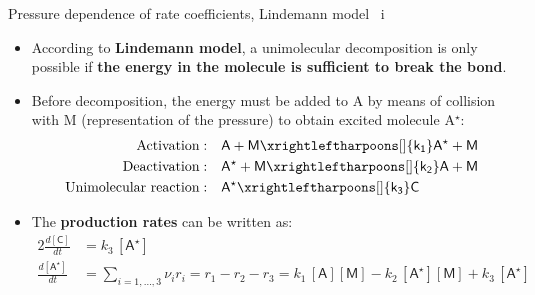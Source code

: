 %
%
\begin{frame}{Pressure dependence of rate coefficients, Lindemann model \, i}
	\begin{itemize}
		\item According to \alert{\bf Lindemann model}, a unimolecular decomposition is only possible if {\bf the energy in the molecule is 
		sufficient to break the bond}.
		\item Before decomposition, the energy must be added to A by means of collision with M (representation of the pressure) to obtain excited molecule A$^\star$:
		 \begin{alignat*}{2}
			\mbox{Activation} : & \quad \mathsf{A + M \xrightleftharpoons[]{k_1} A^\star + M} \\
			\mbox{Deactivation}: & \quad \mathsf{A^\star + M \xrightleftharpoons[]{k_2} A + M} \\
			\mbox{Unimolecular reaction}: & \quad \mathsf{A^\star \xrightleftharpoons[]{k_3} C}
		 \end{alignat*}
		\item The {\bf production rates} can be written as: 
		 \begin{alignat*}{2}
			\tfrac{d\mathsf{[C]}}{dt}          & = k_3 \, \mathsf{[A^\star]} \\
			\tfrac{d\mathsf{[A^\star]}}{dt} & 
			= \sum_{i = 1, \ldots, 3} \nu_i r_i 
			=  r_1 - r_2 - r_3 
			= k_1 \, \mathsf{[A][M]} - k_2 \, \mathsf{[A^\star][M]} + k_3 \, \mathsf{[A^\star]}
		\end{alignat*}
	\end{itemize}
\end{frame}
%
%
